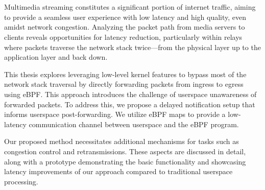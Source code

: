 \chapter{\abstractname}

Multimedia streaming constitutes a significant portion of internet traffic,
aiming to provide a seamless user experience with low latency and high quality, 
even amidst network congestion. 
Analyzing the packet path from media servers to clients reveals opportunities 
for latency reduction, particularly within relays where packets traverse the 
network stack twice—from the physical layer up to the application layer 
and back down.

This thesis explores leveraging low-level kernel features to bypass most of the network 
stack traversal by directly forwarding packets from ingress to egress using eBPF\@. 
This approach introduces the challenge of userspace unawareness of forwarded packets. 
To address this, we propose a delayed notification setup that informs userspace post-forwarding. 
We utilize eBPF maps to provide a low-latency communication channel between userspace 
and the eBPF program.

Our proposed method necessitates additional mechanisms for tasks such as congestion 
control and retransmissions. 
These aspects are discussed in detail, along with a prototype demonstrating the 
basic functionality and showcasing latency improvements of our approach compared 
to traditional userspace processing.




